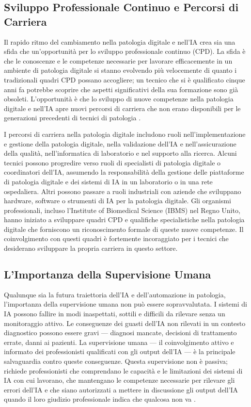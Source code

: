 \subsection{Sviluppo Professionale Continuo e Percorsi di Carriera}

Il rapido ritmo del cambiamento nella patologia digitale e nell'IA crea sia una sfida che un'opportunità per lo sviluppo professionale continuo (CPD). La sfida è che le conoscenze e le competenze necessarie per lavorare efficacemente in un ambiente di patologia digitale si stanno evolvendo più velocemente di quanto i tradizionali quadri CPD possano accogliere; un tecnico che si è qualificato cinque anni fa potrebbe scoprire che aspetti significativi della sua formazione sono già obsoleti. L'opportunità è che lo sviluppo di nuove competenze nella patologia digitale e nell'IA apre nuovi percorsi di carriera che non erano disponibili per le generazioni precedenti di tecnici di patologia \cite{hanna2024}.

I percorsi di carriera nella patologia digitale includono ruoli nell'implementazione e gestione della patologia digitale, nella validazione dell'IA e nell'assicurazione della qualità, nell'informatica di laboratorio e nel supporto alla ricerca. Alcuni tecnici possono progredire verso ruoli di specialisti di patologia digitale o coordinatori dell'IA, assumendo la responsabilità della gestione delle piattaforme di patologia digitale e dei sistemi di IA in un laboratorio o in una rete ospedaliera. Altri possono passare a ruoli industriali con aziende che sviluppano hardware, software o strumenti di IA per la patologia digitale. Gli organismi professionali, incluso l'Institute of Biomedical Science (IBMS) nel Regno Unito, hanno iniziato a sviluppare quadri CPD e qualifiche specialistiche nella patologia digitale che forniscono un riconoscimento formale di queste nuove competenze. Il coinvolgimento con questi quadri è fortemente incoraggiato per i tecnici che desiderano sviluppare la propria carriera in questo settore.

\subsection{L'Importanza della Supervisione Umana}

Qualunque sia la futura traiettoria dell'IA e dell'automazione in patologia, l'importanza della supervisione umana non può essere sopravvalutata. I sistemi di IA possono fallire in modi inaspettati, sottili e difficili da rilevare senza un monitoraggio attivo. Le conseguenze dei guasti dell'IA non rilevati in un contesto diagnostico possono essere gravi — diagnosi mancate, decisioni di trattamento errate, danni ai pazienti. La supervisione umana — il coinvolgimento attivo e informato dei professionisti qualificati con gli output dell'IA — è la principale salvaguardia contro queste conseguenze. Questa supervisione non è passiva; richiede professionisti che comprendano le capacità e le limitazioni dei sistemi di IA con cui lavorano, che mantengano le competenze necessarie per rilevare gli errori dell'IA e che siano autorizzati a mettere in discussione gli output dell'IA quando il loro giudizio professionale indica che qualcosa non va \cite{zhang2023}.

